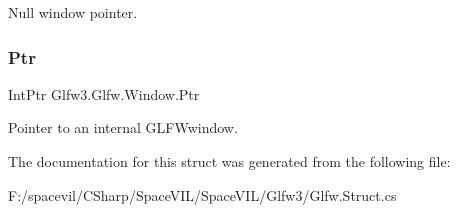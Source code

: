 Null window pointer.\mbox{\label{struct_glfw3_1_1_glfw_1_1_window_a7430cab046e77307dd5c30f153b1d25e}} 
\subsubsection{\texorpdfstring{Ptr}{Ptr}}
{\footnotesize\ttfamily Int\+Ptr Glfw3.\+Glfw.\+Window.\+Ptr}



Pointer to an internal G\+L\+F\+Wwindow. 



The documentation for this struct was generated from the following file\+:\begin{DoxyCompactItemize}
\item 
F\+:/spacevil/\+C\+Sharp/\+Space\+V\+I\+L/\+Space\+V\+I\+L/\+Glfw3/Glfw.\+Struct.\+cs\end{DoxyCompactItemize}
